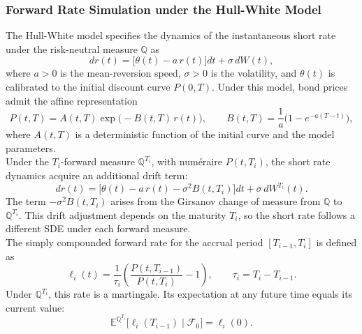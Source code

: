   \subsubsection*{Forward Rate Simulation under the Hull-White Model}
  The Hull-White model specifies the dynamics of the instantaneous short rate under the risk-neutral measure $\mathbb{Q}$ as                                                             
        \begin{equation}\label{eq:hw_model}                                                      
             dr(t) = \bigl[\theta(t) - a\,r(t)\bigr]dt + \sigma\,dW(t),                     
        \end{equation}                                                                                                                                                                          
      where $a > 0$ is the mean-reversion speed, $\sigma > 0$ is the volatility, and $\theta(t)$ is calibrated to the initial discount curve $P(0, T)$. Under this model, bond prices admit
  the affine representation
      \begin{equation}\label{eq:affine_bond}
          P(t, T) = A(t, T)\exp\!\bigl(-B(t, T)\,r(t)\bigr), \qquad B(t, T) = \frac{1}{a}\bigl(1 - e^{-a(T-t)}\bigr),
      \end{equation}
      where $A(t, T)$ is a deterministic function of the initial curve and the model parameters.\\

      \noindent
      Under the $T_i$-forward measure $\mathbb{Q}^{T_i}$, with num\'{e}raire $P(t, T_i)$, the short rate dynamics acquire an additional drift term:
      \begin{equation}\label{eq:hw_forward_measure}
          dr(t) = \bigl[\theta(t) - a\,r(t) - \sigma^2 B(t, T_i)\bigr]dt + \sigma\,dW^{T_i}(t).
      \end{equation}
      The term $-\sigma^2 B(t, T_i)$ arises from the Girsanov change of measure from $\mathbb{Q}$ to $\mathbb{Q}^{T_i}$. This drift adjustment depends on the maturity $T_i$, so the short
  rate follows a different SDE under each forward measure.\\

      \noindent
      The simply compounded forward rate for the accrual period $[T_{i-1}, T_i]$ is defined as
      \begin{equation}\label{eq:forward_libor}
          \ell_i(t) = \frac{1}{\tau_i}\left(\frac{P(t, T_{i-1})}{P(t, T_i)} - 1\right), \qquad \tau_i = T_i - T_{i-1}.
      \end{equation}
      Under $\mathbb{Q}^{T_i}$, this rate is a martingale. Its expectation at any future time equals its current value:
      \begin{equation}\label{eq:libor_martingale}
          \mathbb{E}^{\mathbb{Q}^{T_i}}\bigl[\ell_i(T_{i-1}) \mid \mathcal{F}_0\bigr] = \ell_i(0).
      \end{equation}

